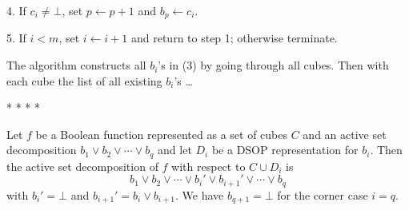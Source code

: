 \item{4.}  If $c_i \neq \bot$, set $p \leftarrow p + 1$ and $b_p \leftarrow
c_i$.

\item{5.}  If $i<m$, set $i\leftarrow i + 1$ and return to step 1; otherwise
terminate.

\medskip\noindent The algorithm constructs all $b_i$'s in (3) by going through
all cubes.  Then with each cube the list of all existing $b_i$'s \dots

\bigskip \centerline{* * * *} \bigskip

  Let $f$ be a Boolean function represented as a set
of cubes $C$ and an active set decomposition $b_1\lor b_2\lor \cdots\lor b_q$
and let $D_i$ be a DSOP representation for $b_i$.  Then the active set
decomposition of $f$ with respect to $C\cup D_i$ is
$$ b_1 \lor b_2 \lor \cdots \lor b_i' \lor b_{i+1}' \lor \cdots \lor b_q $$
with $b_i' = \bot$ and $b_{i+1}'=b_i \lor b_{i+1}$.  We have $b_{q+1}=\bot$ for
the corner case $i=q$.

\smallskip{}


\bye



